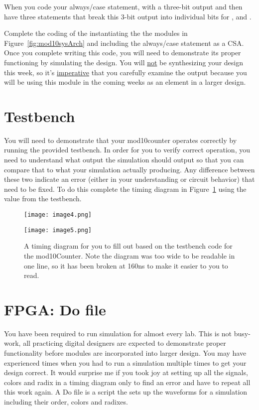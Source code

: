 When you code your always/case statement, with a three-bit output and
then have three  statements that break this 3-bit output
into individual bits for ,  and .

\hypertarget{link:mod10Verilog}{}{}
Complete the coding of the  instantiating the
the modules in Figure~\ref{fig:mod10sysArch} and including the
always/case statement as a CSA.  Once you complete writing this
code, you will need to demonstrate its proper functioning by
simulating the design.  You will \underline{not} be synthesizing 
your design this week, so it's \underline{imperative} that you carefully
examine the output because you will be using this module
in the coming weeks as an element in a larger design.


\section{Testbench}

You will need to demonstrate that your mod10counter operates correctly
by running the provided testbench. In order for you to verify correct
operation, you need to understand what output the simulation should
output so that you can compare that to what your simulation actually
producing. Any difference between these two indicate an error (either in
your understanding or circuit behavior) that need to be fixed. To do
this complete the timing diagram in Figure~\ref{fig:mod10TimingDiamgram} using the value from the
testbench.

\begin{landscape}
\begin{figure}[ht]
\texttt{[image: image4.png]}

\texttt{[image: image5.png]}

\caption{A timing diagram for you to fill out based on the testbench
code for the mod10Counter. Note the diagram was too wide to be readable
in one line, so it has been broken at 160ns to make it easier to
you to read.}
\label{fig:mod10TimingDiamgram}
\end{figure}
\end{landscape}

\section{FPGA: Do file}

You have been required to run simulation for almost every lab. This is not 
busy-work, all practicing digital designers are expected to demonstrate
proper functionality before modules are incorporated into larger design.
You may have experienced times when you had to run a simulation 
multiple times to get your design correct.  It would surprise me if you
took joy at setting up all the signals, colors and radix in a timing
diagram only to find an error and have to repeat all this work again.
A Do file is a script the sets up the waveforms for a simulation 
including their order, colors and radixes. 

